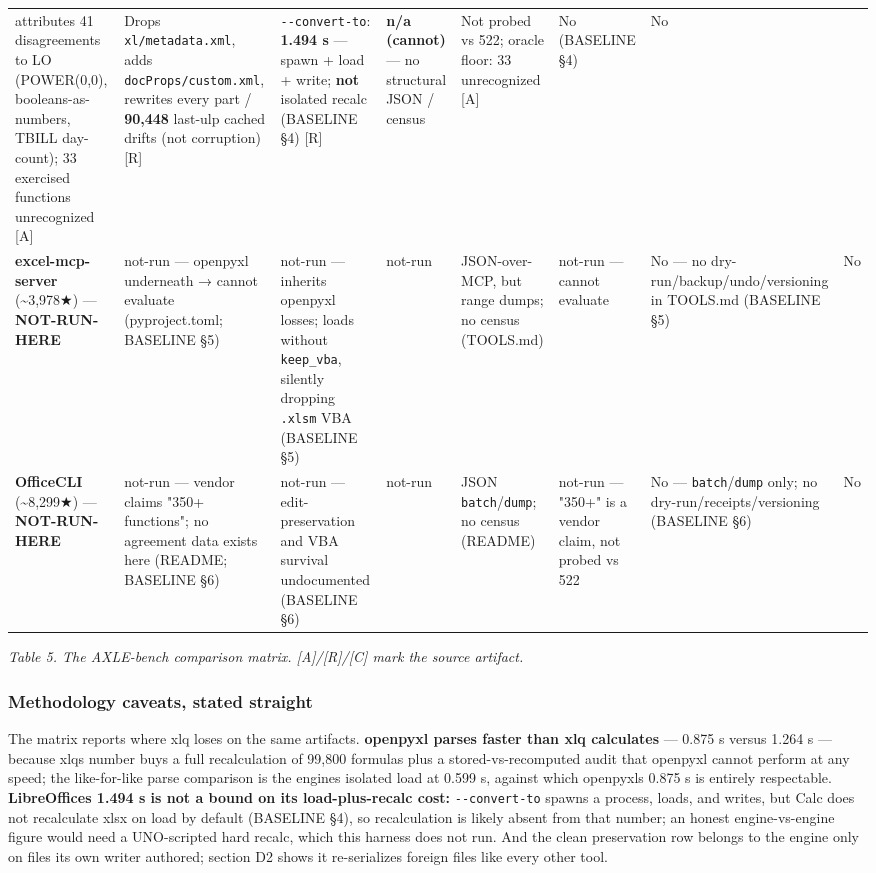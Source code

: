 \documentclass[
]{article}
\begin{document}
{\begin{longtable}[]{@{}llllllll@{}}
attributes 41 disagreements to LO (POWER(0,0), booleans-as-numbers,
TBILL day-count); 33 exercised functions unrecognized {[}A{]} & Drops
\texttt{xl/metadata.xml}, adds \texttt{docProps/custom.xml}, rewrites
every part / \textbf{90,448} last-ulp cached drifts (not corruption)
{[}R{]} & \texttt{-\/-convert-to}: \textbf{1.494 s} --- spawn + load +
write; \textbf{not} isolated recalc (BASELINE §4) {[}R{]} & \textbf{n/a
(cannot)} --- no structural JSON / census & Not probed vs 522; oracle
floor: 33 unrecognized {[}A{]} & No (BASELINE §4) & No \\
\textbf{excel-mcp-server} (\textasciitilde3,978★) ---
\textbf{NOT-RUN-HERE} & not-run --- openpyxl underneath → cannot
evaluate (pyproject.toml; BASELINE §5) & not-run --- inherits openpyxl
losses; loads without \texttt{keep\_vba}, silently dropping
\texttt{.xlsm} VBA (BASELINE §5) & not-run & JSON-over-MCP, but range
dumps; no census (TOOLS.md) & not-run --- cannot evaluate & No --- no
dry-run/backup/undo/versioning in TOOLS.md (BASELINE §5) & No \\
\textbf{OfficeCLI} (\textasciitilde8,299★) --- \textbf{NOT-RUN-HERE} &
not-run --- vendor claims "350+ functions"; no agreement data exists
here (README; BASELINE §6) & not-run --- edit-preservation and VBA
survival undocumented (BASELINE §6) & not-run & JSON
\texttt{batch}/\texttt{dump}; no census (README) & not-run --- "350+" is
a vendor claim, not probed vs 522 & No --- \texttt{batch}/\texttt{dump}
only; no dry-run/receipts/versioning (BASELINE §6) & No \\
\end{longtable}
}

\emph{Table 5. The AXLE-bench comparison matrix. {[}A{]}/{[}R{]}/{[}C{]}
mark the source artifact.}

\subsubsection{Methodology caveats, stated
straight}\label{methodology-caveats-stated-straight}

The matrix reports where xlq loses on the same artifacts.
\textbf{openpyxl parses faster than xlq calculates} --- 0.875 s versus
1.264 s --- because xlq\textquotesingle s number buys a full
recalculation of 99,800 formulas plus a stored-vs-recomputed audit that
openpyxl cannot perform at any speed; the like-for-like parse comparison
is the engine\textquotesingle s isolated load at 0.599 s, against which
openpyxl\textquotesingle s 0.875 s is entirely respectable.
\textbf{LibreOffice\textquotesingle s 1.494 s is not a bound on its
load-plus-recalc cost:} \texttt{-\/-convert-to} spawns a process, loads,
and writes, but Calc does not recalculate xlsx on load by default
(BASELINE §4), so recalculation is likely absent from that number; an
honest engine-vs-engine figure would need a UNO-scripted hard recalc,
which this harness does not run. And the clean preservation row belongs
to the engine only on files its own writer authored; section D2 shows it
re-serializes foreign files like every other tool.
\end{document}
